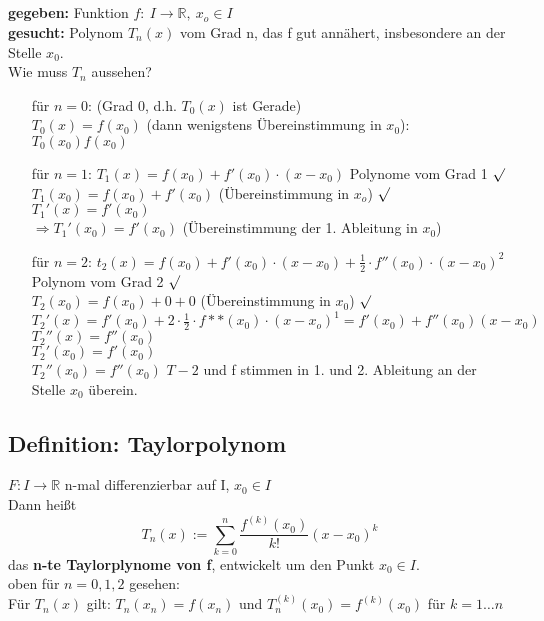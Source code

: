 \subsection*{}
\textbf{gegeben:} Funktion $f: \ I\rightarrow \mathbb{R}, \ x_o\in I$\\
\textbf{gesucht:} Polynom $T_n(x)$ vom Grad n, das f gut annähert, insbesondere an der Stelle $x_0$.\\
Wie muss $T_n$ aussehen?
\begin{enumerate}
	\item[für $n=0$:]
	(Grad 0, d.h. $T_0(x)$ ist Gerade)\\
	$T_0(x)=f(x_0)$ (dann wenigstens Übereinstimmung in $x_0$):\\
	$T_0(x_0)f(x_0)$
	
	\item[für $n=1$:]
	$T_1(x)=f(x_0)+f'(x_0)\cdot (x-x_0)$ Polynome vom Grad 1 $\surd$\\
	$T_1(x_0)=f(x_0)+f'(x_0)$ (Übereinstimmung in $x_o$) $\surd$\\
	$T_1'(x)=f'(x_0)$\\
	$\Rightarrow T_1'(x_0)=f'(x_0)$ (Übereinstimmung der 1. Ableitung in $x_0$)
	
	\item[für $n=2$:]
	$t_2(x)=f(x_0)+f'(x_0)\cdot (x-x_0)+\frac{1}{2}\cdot f''(x_0)\cdot (x-x_0)^2$ Polynom vom Grad 2 $\surd$\\
	$T_2(x_0)=f(x_0)+0+0$ (Übereinstimmung in $x_0$) $\surd$\\
	$T_2'(x)=f'(x_0)+2\cdot \frac{1}{2}\cdot f**(x_0)\cdot (x-x_o)^1=f'(x_0)+f''(x_0)(x-x_0)$\\
	$T_2''(x)=f''(x_0)$\\
	$T_2'(x_0)=f'(x_0)$\\
	$T_2''(x_0)=f''(x_0)$ $T-2$ und f stimmen in 1. und 2. Ableitung an der Stelle $x_0$ überein.
\end{enumerate}

\subsection{Definition: Taylorpolynom}
$F:I\rightarrow \mathbb{R}$ n-mal differenzierbar auf I, $x_0\in I$\\
Dann heißt \[T_n(x):=\sum_{k=0}^n \frac{f^{(k)}(x_0)}{k!}(x-x_0)^k\] das \textbf{n-te Taylorplynome von f}, entwickelt um den Punkt $x_0\in I$.\\
oben für $n=0,1,2$ gesehen:\\
Für $T_n(x)$ gilt: $T_n(x_n)=f(x_n)$ und $T_n^{(k)}(x_0)=f^{(k)}(x_0)$ für $k=1\dots n$


